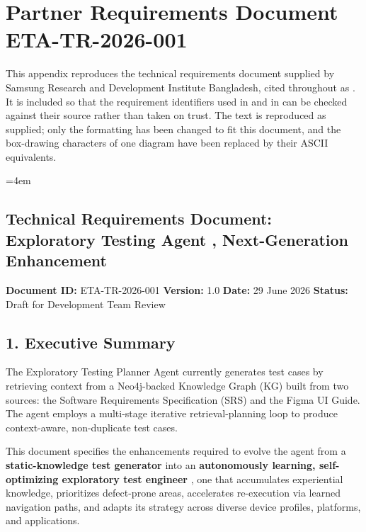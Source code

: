 \appendix
\chapter{Partner Requirements Document ETA-TR-2026-001}
\label{app:etatr}

\noindent This appendix reproduces the technical requirements document supplied
by Samsung Research and Development Institute Bangladesh, cited throughout as
\cite{etatr}. It is included so that the requirement identifiers used in
 and in  can be checked against their
source rather than taken on trust. The text is reproduced as supplied; only the
formatting has been changed to fit this document, and the box-drawing
characters of one diagram have been replaced by their ASCII equivalents.

\bigskip

\begingroup
\sloppy
\emergencystretch=4em
\small

\section*{Technical Requirements Document: Exploratory Testing Agent ,  Next-Generation Enhancement}

\textbf{Document ID:} ETA-TR-2026-001
\textbf{Version:} 1.0
\textbf{Date:} 29 June 2026
\textbf{Status:} Draft for Development Team Review

\section*{1. Executive Summary}

The Exploratory Testing Planner Agent currently generates test cases by retrieving context from a Neo4j-backed Knowledge Graph (KG) built from two sources: the Software Requirements Specification (SRS) and the Figma UI Guide. The agent employs a multi-stage iterative retrieval-planning loop to produce context-aware, non-duplicate test cases.

This document specifies the enhancements required to evolve the agent from a \textbf{static-knowledge test generator} into an \textbf{autonomously learning, self-optimizing exploratory test engineer} ,  one that accumulates experiential knowledge, prioritizes defect-prone areas, accelerates re-execution via learned navigation paths, and adapts its strategy across diverse device profiles, platforms, and applications.

